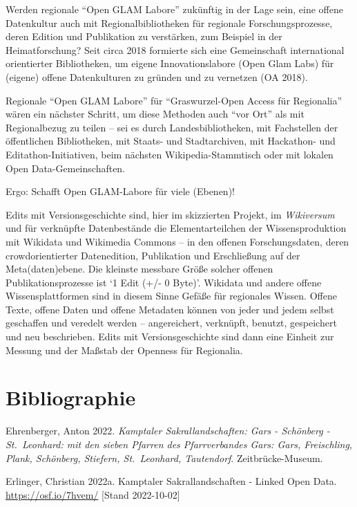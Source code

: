 \documentclass[a4paper,
fontsize=11pt,
oneside,
numbers=noperiodatend,
parskip=half-,
bibliography=totoc,
final
]{scrartcl}
\begin{document}
Werden regionale \enquote{Open GLAM Labore} zukünftig in der Lage sein,
eine offene Datenkultur auch mit Regionalbibliotheken für regionale
Forschungsprozesse, deren Edition und Publikation zu verstärken, zum
Beispiel in der Heimatforschung? Seit circa 2018 formierte sich eine
Gemeinschaft international orientierter Bibliotheken, um eigene
Innovationslabore (Open Glam Labs) für (eigene) offene Datenkulturen zu
gründen und zu vernetzen (OA 2018).

Regionale \enquote{Open GLAM Labore} für \enquote{Graswurzel-Open Access
für Regionalia} wären ein nächster Schritt, um diese Methoden auch
\enquote{vor Ort} als mit Regionalbezug zu teilen -- sei es durch
Landesbibliotheken, mit Fachstellen der öffentlichen Bibliotheken, mit
Staats- und Stadtarchiven, mit Hackathon- und Editathon-Initiativen,
beim nächsten Wikipedia-Stammtisch oder mit lokalen Open
Data-Gemeinschaften.

Ergo: Schafft Open GLAM-Labore für viele (Ebenen)!

Edits mit Versionsgeschichte sind, hier im skizzierten Projekt, im
\emph{Wikiversum} und für verknüpfte Datenbestände die Elementarteilchen
der Wissensproduktion mit Wikidata und Wikimedia Commons -- in den
offenen Forschungsdaten, deren crowdorientierter Datenedition,
Publikation und Erschließung auf der Meta(daten)ebene. Die kleinste
messbare Größe solcher offenen Publikationsprozesse ist \enquote*{1 Edit
(+/- 0 Byte)}. Wikidata und andere offene Wissensplattformen sind in
diesem Sinne Gefäße für regionales Wissen. Offene Texte, offene Daten
und offene Metadaten können von jeder und jedem selbst geschaffen und
veredelt werden -- angereichert, verknüpft, benutzt, gespeichert und neu
beschrieben. Edits mit Versionsgeschichte sind dann eine Einheit zur
Messung und der Maßstab der Openness für Regionalia.

\hypertarget{bibliographie}{%
\section{Bibliographie}\label{bibliographie}}

Ehrenberger, Anton 2022. \emph{Kamptaler Sakrallandschaften: Gars -
Schönberg - St.~Leonhard: mit den sieben Pfarren des Pfarrverbandes
Gars: Gars, Freischling, Plank, Schönberg, Stiefern, St.~Leonhard,
Tautendorf}. Zeitbrücke-Museum.

Erlinger, Christian 2022a. Kamptaler Sakrallandschaften - Linked Open
Data. \url{https://osf.io/7hvem/} {[}Stand 2022-10-02{]}
\end{document}
